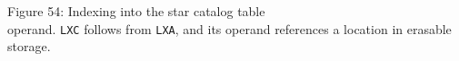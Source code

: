 \documentclass[refcap, oxford]{ahsan}
\begin{document}

Figure 54: Indexing into the star catalog table\\
operand. \texttt{LXC} follows from \texttt{LXA}, and its operand references a location in erasable storage.
\end{document}
